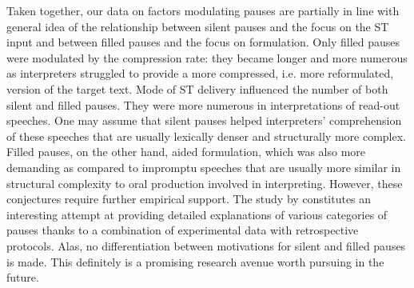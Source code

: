 \documentclass[output=paper]{langscibook}
\begin{document}
Taken together, our data on factors modulating pauses are partially in line with  general idea of the relationship between silent pauses and the focus on the ST input and between filled pauses and the focus on formulation. Only filled pauses were modulated by the compression rate: they became longer and more numerous as interpreters struggled to provide a more compressed, i.e. more reformulated, version of the target text. Mode of ST delivery influenced the number of both silent and filled pauses. They were more numerous in interpretations of read-out speeches. One may assume that silent pauses helped interpreters’ comprehension of these speeches that are usually lexically denser and structurally more complex. Filled pauses, on the other hand, aided formulation, which was also more demanding as compared to impromptu speeches that are usually more similar in structural complexity to oral production involved in interpreting. However, these conjectures require further empirical support. The study by \citet{WangLi2014} constitutes an interesting attempt at providing detailed explanations of various categories of pauses thanks to a combination of experimental data with retrospective protocols. Alas, no differentiation between motivations for silent and filled pauses is made. This definitely is a promising research avenue worth pursuing in the future. 
\end{document}
